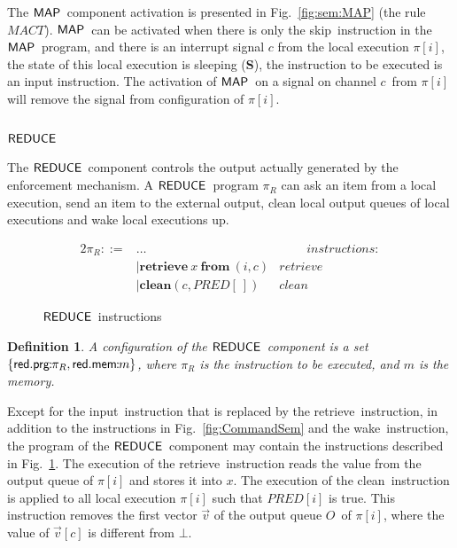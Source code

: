 \documentclass[10pt,a4paper,oneside]{article}
\newtheorem{definition}{Definition}[section]
\def\intsig#1{\ensuremath{#1}}
\def\sS{\textbf{S}}
\def\chnl{\ensuremath{c}}
\def\NIL{\ensuremath{\bot}}
\def\lpair#1#2{#1\!\!:\!\!\ensuremath{#2}}
\def\sanserif#1{\ensuremath{\sf #1}}
\def\REDUCE{\ensuremath{\sanserif{REDUCE}}}
\def\MAP{\ensuremath{\sanserif{MAP}}}
\def\Prog{\ensuremath{\pi}}
\def\Progl#1{\ensuremath{\Prog[#1]}}
\def\comm{\ensuremath{\pi}}
\def\commR{\ensuremath{\comm_R}}
\def\Oid{\ensuremath{O}}
\def\RMAPINIT{MACT}
\def\NSKIP{skip}
\def\NINPUT{input}
\def\NWAKE{wake}
\def\NINPUTR{retrieve}
\def\NCLEAN{clean}
\def\iinputr#1#2#3{\textbf{retrieve}~\ensuremath{#1}~\textbf{from}~(#2,#3)}
\def\iclean#1#2{\ensuremath{\textbf{\NCLEAN}(#1,#2)}}
\def\spaceIns{~~~~~~~~~~}
\def\NPRED{\ensuremath{PRED}}
\def\emptyPlace{\ensuremath{[\ ]}}
\def\PREDD{\ensuremath{\NPRED\emptyPlace}}
\def\PREDE#1{\ensuremath{\NPRED[#1]}}
\def\lprogr{{\sf prg}}
\def\lmem{{\sf mem}}
\def\lreduce{{\sf red}}
\begin{document}
The \MAP\ component activation is presented in Fig.~\ref{fig:sem:MAP} (the rule $\RMAPINIT$). \MAP\ can be activated when there is only the \NSKIP\ instruction in the \MAP\ program, and there is an interrupt signal  \intsig{\chnl} from the local execution \Progl{i}, the state of this local execution is sleeping (\sS), the instruction to be executed is an input instruction.  The activation of \MAP\  on a signal on channel \chnl\ from \Progl{i} will remove the signal from configuration of \Progl{i}.


\subsection{\REDUCE} \label{sec:emp:reduce}
The \REDUCE\ component controls the output actually generated by the enforcement mechanism. A \REDUCE\ program $\comm_R$ can ask an item from a local execution, send an item to the external output, clean local output queues of local executions and wake local executions up.

\begin{figure}
\centering
	\begin{alignat*}{2}
		\commR ::=&\dots & \spaceIns instructions:\\
		& |\iinputr{x}{i}{\chnl} & \NINPUTR\\
		& |\iclean{\chnl}{\PREDD} & \NCLEAN
	\end{alignat*}
\caption{\REDUCE\ instructions}
\label{fig:comm:REDUCE}
\end{figure}

\begin{definition}\label{def:execConf:REDUCE}
A configuration of the \REDUCE\ component is a set $\{\lreduce.\lpair{\lprogr}{\commR}, \lreduce.\lpair{\lmem}{m}\}$, where $\comm_R$ is the instruction to be executed, and $m$ is the memory.
\end{definition}

Except for the \NINPUT\ instruction that is replaced by the \NINPUTR\ instruction, in addition to the instructions in Fig.~\ref{fig:CommandSem} and the \NWAKE\ instruction, the program of the \REDUCE\ component may contain the instructions described in Fig.~\ref{fig:comm:REDUCE}. The execution of the \NINPUTR\ instruction reads the value from the output queue of $\Progl{i}$ and stores it into $x$. The execution of the \NCLEAN\ instruction is applied to all local execution \Progl{i} such that \PREDE{i} is true. This instruction removes the first vector $\vec{v}$ of the output queue \Oid\ of \Progl{i}, where the value of $\vec{v}[\chnl]$ is different from \NIL.
\end{document}
